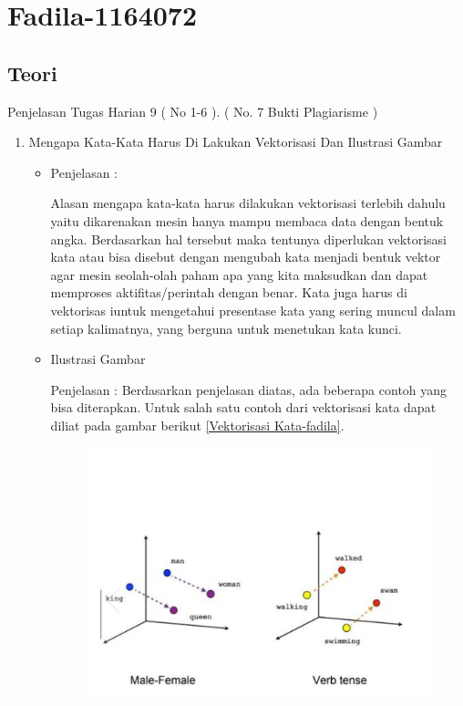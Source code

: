 \par
\par
\par
\par
\par
\section{Fadila-1164072}
\subsection{Teori}
Penjelasan Tugas Harian 9 ( No 1-6 ). ( No. 7 Bukti Plagiarisme )
\begin{enumerate}
\item Mengapa Kata-Kata Harus Di Lakukan Vektorisasi Dan Ilustrasi Gambar
\begin{itemize}
\item Penjelasan :
\par Alasan mengapa kata-kata harus dilakukan vektorisasi terlebih dahulu yaitu dikarenakan mesin hanya mampu membaca data dengan bentuk angka. Berdasarkan hal tersebut maka tentunya diperlukan vektorisasi kata atau bisa disebut dengan mengubah kata menjadi bentuk vektor agar mesin seolah-olah paham apa yang kita maksudkan dan dapat memproses aktifitas/perintah dengan benar. Kata juga harus di vektorisas iuntuk mengetahui presentase kata yang sering muncul dalam setiap kalimatnya, yang berguna untuk menetukan kata kunci.
\par
\item Ilustrasi Gambar
\par Penjelasan : Berdasarkan penjelasan diatas, ada beberapa contoh yang bisa diterapkan. Untuk salah satu contoh dari vektorisasi kata dapat diliat pada gambar berikut \ref{Vektorisasi Kata-fadila}.
\begin{figure}[!hbtp]
\centering
\includegraphics[scale=0.2]{figures/word-vec-fadila.jpg}

\end{figure}
\end{itemize}
\end{enumerate}
